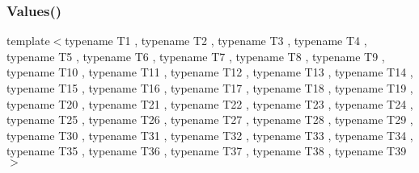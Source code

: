 \mbox{\label{namespacetesting_aba3a6a2dcb9660c6ccb1d867c7a137ee}} 
\subsubsection{\texorpdfstring{Values()}{Values()}\hspace{0.1cm}{\footnotesize\ttfamily [39/50]}}
{\footnotesize\ttfamily template$<$typename T1 , typename T2 , typename T3 , typename T4 , typename T5 , typename T6 , typename T7 , typename T8 , typename T9 , typename T10 , typename T11 , typename T12 , typename T13 , typename T14 , typename T15 , typename T16 , typename T17 , typename T18 , typename T19 , typename T20 , typename T21 , typename T22 , typename T23 , typename T24 , typename T25 , typename T26 , typename T27 , typename T28 , typename T29 , typename T30 , typename T31 , typename T32 , typename T33 , typename T34 , typename T35 , typename T36 , typename T37 , typename T38 , typename T39 $>$ \\
}
